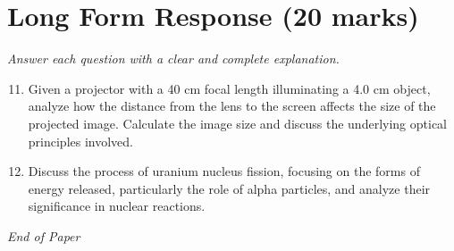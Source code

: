 \documentclass[12pt]{article}
\begin{document}
\section*{Long Form Response (20 marks)}
\textit{Answer each question with a clear and complete explanation.}
\begin{enumerate}[label=\arabic*.]
\setcounter{enumi}{10}
\item Given a projector with a 40 cm focal length illuminating a 4.0 cm object, analyze how the distance from the lens to the screen affects the size of the projected image. Calculate the image size and discuss the underlying optical principles involved.
\item Discuss the process of uranium nucleus fission, focusing on the forms of energy released, particularly the role of alpha particles, and analyze their significance in nuclear reactions.
\end{enumerate}

\vfill
\noindent\textit{End of Paper}
\end{document}
